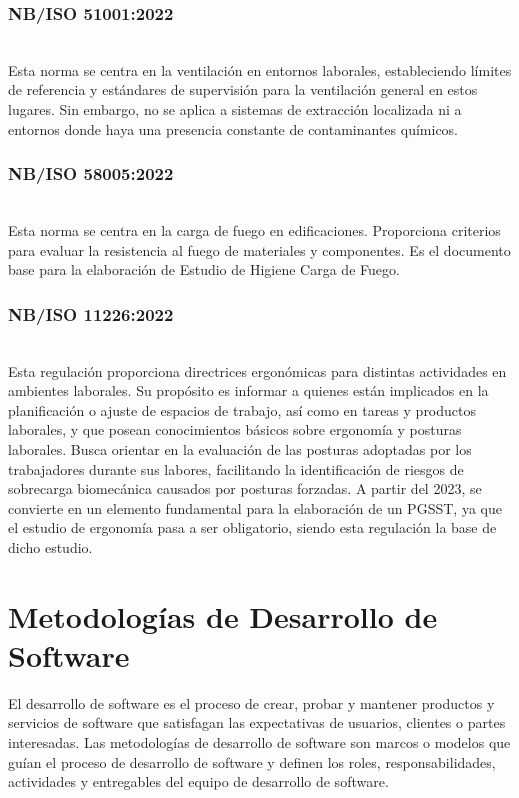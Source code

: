 \subsubsection{NB/ISO 51001:2022}\hfill\\ %
\indent
Esta norma se centra en la ventilación en entornos laborales, estableciendo límites de referencia y estándares de supervisión para la ventilación general en estos lugares. Sin embargo, no se aplica a sistemas de extracción localizada ni a entornos donde haya una presencia constante de contaminantes químicos.

\subsubsection{NB/ISO 58005:2022}\hfill\\ %
\indent
Esta norma se centra en la carga de fuego en edificaciones. Proporciona criterios para evaluar la resistencia al fuego de materiales y componentes. Es el documento base para la elaboración
de Estudio de Higiene Carga de Fuego.

\subsubsection{NB/ISO 11226:2022}\hfill\\ %
\indent
Esta regulación proporciona directrices ergonómicas para distintas actividades en ambientes laborales. Su propósito es informar a quienes están implicados en la planificación o ajuste de espacios de trabajo, así como en tareas y productos laborales, y que posean conocimientos básicos sobre ergonomía y posturas laborales. Busca orientar en la evaluación de las posturas adoptadas por los trabajadores durante sus labores, facilitando la identificación de riesgos de sobrecarga biomecánica causados por posturas forzadas. A partir del 2023, se convierte en un elemento fundamental para la elaboración de un PGSST, ya que el estudio de ergonomía pasa a ser obligatorio, siendo esta regulación la base de dicho estudio.

\section{Metodologías de Desarrollo de Software}
El desarrollo de software es el proceso de crear, probar y mantener productos y servicios de software que satisfagan las expectativas de usuarios, clientes o partes interesadas. Las metodologías de desarrollo de software son marcos o modelos que guían el proceso de desarrollo de software y definen los roles, responsabilidades, actividades y entregables del equipo de desarrollo de software.
